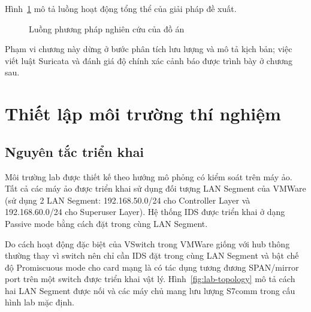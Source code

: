 \documentclass[../main.tex]{subfiles}
\begin{document}
Hình~\ref{fig:methodology-flow} mô tả luồng hoạt động tổng thể của giải pháp đề xuất. 

\begin{figure}[H]
    \centering
    \caption{Luồng phương pháp nghiên cứu của đồ án}
    \label{fig:methodology-flow}
\end{figure}

Phạm vi chương này dừng ở bước phân tích lưu lượng và mô tả kịch bản; việc viết luật Suricata và đánh giá độ chính xác cảnh báo được trình bày ở chương sau.

\section{Thiết lập môi trường thí nghiệm}
\label{sec:lab-setup}

\subsection{Nguyên tắc triển khai}

Môi trường lab được thiết kế theo hướng mô phỏng có kiểm soát trên máy ảo. Tất cả các máy ảo được triển khai sử dụng đối tượng LAN Segment của VMWare (sử dụng 2 LAN Segment: 192.168.50.0/24 cho Controller Layer và 192.168.60.0/24 cho Superuser Layer). Hệ thống IDS được triển khai ở dạng Passive mode bằng cách đặt trong cùng LAN Segment. 

Do cách hoạt động đặc biệt của VSwitch trong VMWare giống với hub thông thường thay vì switch nên chỉ cần IDS đặt trong cùng LAN Segment và bật chế độ Promiscuous mode cho card mạng là có tác dụng tương đương SPAN/mirror port trên một switch được triển khai vật lý. Hình~\ref{fig:lab-topology} mô tả cách hai LAN Segment được nối và các máy chủ mang lưu lượng S7comm trong cấu hình lab mặc định.
\end{document}
